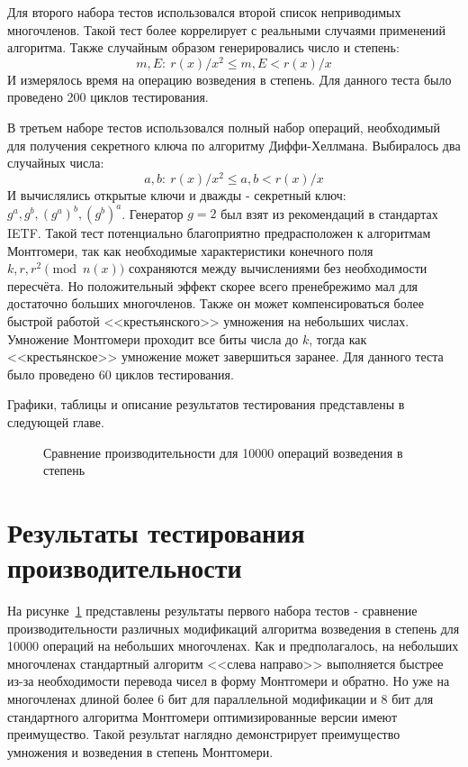 \documentclass[times,specification,annotation]{itmo-student-thesis}
\begin{document}
Для второго набора тестов использовался второй список неприводимых многочленов.
Такой тест более коррелирует с реальными случаями применений алгоритма.
Также случайным образом генерировались число и степень:
\[m, E:~r(x)/x^2 \leq m, E < r(x)/x\]
И измерялось время на операцию возведения в степень.
Для данного теста было проведено 200 циклов тестирования.

В третьем наборе тестов использовался полный набор операций, необходимый для получения секретного ключа по алгоритму Диффи-Хеллмана.
Выбиралось два случайных числа:
\[a, b:~r(x)/x^2 \leq a,b < r(x)/x\]
И вычислялись открытые ключи и дважды - секретный ключ: $g^a, g^b, (g^a)^b, (g^b)^a$.
Генератор $g = 2$ был взят из рекомендаций в стандартах IETF.
Такой тест потенциально благоприятно предрасположен к алгоритмам Монтгомери, так как необходимые характеристики конечного поля
$k, r, r^2 \pmod{n(x)}$ сохраняются между вычислениями без необходимости пересчёта.
Но положительный эффект скорее всего пренебрежимо мал для достаточно больших многочленов.
Также он может компенсироваться более быстрой работой <<крестьянского>> умножения на небольших числах.
Умножение Монтгомери проходит все биты числа до $k$, тогда как <<крестьянское>> умножение может завершиться заранее.
Для данного теста было проведено 60 циклов тестирования.

Графики, таблицы и описание результатов тестирования представлены в следующей главе.

\begin{figure}[!b]
\caption{Сравнение производительности для 10000 операций возведения в степень}\label{fig:res}

\end{figure}

\section{Результаты тестирования производительности}\label{sec:results}

На рисунке~\ref{fig:res} представлены результаты первого набора тестов - сравнение производительности различных
модификаций алгоритма возведения в степень для 10000 операций на небольших многочленах.
Как и предполагалось, на небольших многочленах стандартный алгоритм <<слева направо>> выполняется быстрее из-за
необходимости перевода чисел в форму Монтгомери и обратно.
Но уже на многочленах длиной более 6 бит для параллельной модификации и 8 бит для стандартного алгоритма Монтгомери
оптимизированные версии имеют преимущество.
Такой результат наглядно демонстрирует преимущество умножения и возведения в степень Монтгомери.
\end{document}
